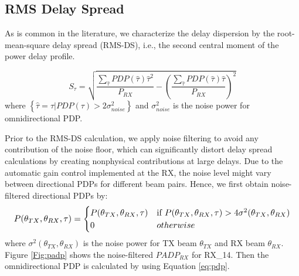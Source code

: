 \documentclass[conference]{IEEEtran}
\begin{document}
 

 
 
\subsection{RMS Delay Spread}

As is common in the literature, we characterize the delay dispersion by the root-mean-square delay spread (RMS-DS), i.e., the second central moment of the power delay profile. 

\begin{equation}
 {\displaystyle S_\tau=\sqrt{\dfrac{\sum\limits_{\hat \tau} PDP(\hat \tau) \hat \tau^2 }{P_{RX}} - \left( \dfrac{\sum\limits_{\hat \tau} PDP( \hat \tau) \hat \tau }{P_{RX}} \right)^2}}
\end{equation}  
where $\left\{ \hat \tau = \tau | PDP(\tau) > 2\sigma_{noise}^2\right\}$ and $\sigma_{noise}^2$ is the noise power for omnidirectional PDP. 

Prior to the RMS-DS calculation, we apply noise filtering to avoid any contribution of the noise floor, which can significantly distort delay spread calculations by creating nonphysical contributions at large delays. Due to the automatic gain control implemented at the RX, the noise level might vary between directional PDPs for different beam pairs. Hence, we first obtain noise-filtered directional PDPs by:
\begin{equation}
\resizebox{1 \linewidth}{!} 
{
    $ P(\theta_{TX},\theta_{RX},\tau)= \begin{cases}
  P(\theta_{TX},\theta_{RX},\tau) & \text{if } P(\theta_{TX},\theta_{RX},\tau) > 4\sigma^2(\theta_{TX},\theta_{RX}) \\
  0 & otherwise
  \end{cases} $
}
\end{equation}
where $\sigma^2(\theta_{TX},\theta_{RX})$ is the noise power for TX beam $\theta_{TX}$ and RX beam $\theta_{RX}$. Figure \ref{Fig:padp} shows the noise-filtered $PADP_{RX}$ for RX\_14. Then the omnidirectional PDP is calculated by using Equation \ref{eq:pdp}.
\end{document}
